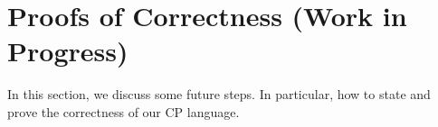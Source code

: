 \section{Proofs of Correctness (Work in Progress)}

In this section, we discuss some future steps. In particular, how to state and prove the correctness of our CP language.

